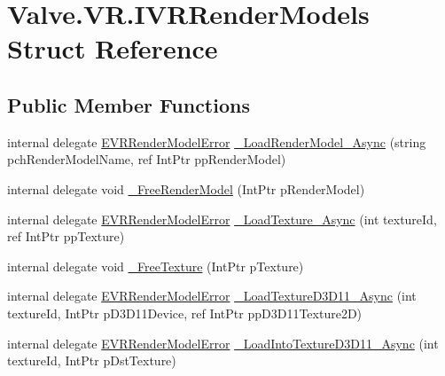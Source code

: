 \hypertarget{struct_valve_1_1_v_r_1_1_i_v_r_render_models}{}\section{Valve.\+V\+R.\+I\+V\+R\+Render\+Models Struct Reference}
\label{struct_valve_1_1_v_r_1_1_i_v_r_render_models}
\subsection*{Public Member Functions}
\begin{DoxyCompactItemize}
\item 
internal delegate \mbox{\hyperlink{namespace_valve_1_1_v_r_ac95dda09bbb588fd83a8ac0ba3c82266}{E\+V\+R\+Render\+Model\+Error}} \mbox{\hyperlink{struct_valve_1_1_v_r_1_1_i_v_r_render_models_aaf7ab82d1e0d29b1f2c7c23444deaa11}{\+\_\+\+Load\+Render\+Model\+\_\+\+Async}} (string pch\+Render\+Model\+Name, ref Int\+Ptr pp\+Render\+Model)
\item 
internal delegate void \mbox{\hyperlink{struct_valve_1_1_v_r_1_1_i_v_r_render_models_a4fa1104771d8555a178db0ff8c817849}{\+\_\+\+Free\+Render\+Model}} (Int\+Ptr p\+Render\+Model)
\item 
internal delegate \mbox{\hyperlink{namespace_valve_1_1_v_r_ac95dda09bbb588fd83a8ac0ba3c82266}{E\+V\+R\+Render\+Model\+Error}} \mbox{\hyperlink{struct_valve_1_1_v_r_1_1_i_v_r_render_models_a5c61ffd1a998ea69d3c9551c22524886}{\+\_\+\+Load\+Texture\+\_\+\+Async}} (int texture\+Id, ref Int\+Ptr pp\+Texture)
\item 
internal delegate void \mbox{\hyperlink{struct_valve_1_1_v_r_1_1_i_v_r_render_models_ac4a47c1b699bbc29965d6ebd54895fe0}{\+\_\+\+Free\+Texture}} (Int\+Ptr p\+Texture)
\item 
internal delegate \mbox{\hyperlink{namespace_valve_1_1_v_r_ac95dda09bbb588fd83a8ac0ba3c82266}{E\+V\+R\+Render\+Model\+Error}} \mbox{\hyperlink{struct_valve_1_1_v_r_1_1_i_v_r_render_models_ab99d05c13fa1b637219e1b307adbf13f}{\+\_\+\+Load\+Texture\+D3\+D11\+\_\+\+Async}} (int texture\+Id, Int\+Ptr p\+D3\+D11\+Device, ref Int\+Ptr pp\+D3\+D11\+Texture2D)
\item 
internal delegate \mbox{\hyperlink{namespace_valve_1_1_v_r_ac95dda09bbb588fd83a8ac0ba3c82266}{E\+V\+R\+Render\+Model\+Error}} \mbox{\hyperlink{struct_valve_1_1_v_r_1_1_i_v_r_render_models_a819d498723194d075a7e114272dce441}{\+\_\+\+Load\+Into\+Texture\+D3\+D11\+\_\+\+Async}} (int texture\+Id, Int\+Ptr p\+Dst\+Texture)
\item 

\end{DoxyCompactItemize}
